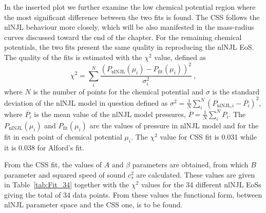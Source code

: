 \documentclass[%
 reprint,
superscriptaddress,
nofootinbib,
 amsmath,amssymb,
 aps,
]{revtex4-1}
\begin{document}
In the inserted plot we further examine the low chemical potential region where the most significant difference between the two fits is found. The CSS follows the nlNJL behaviour more closely, which will be also manifested in the mass-radius curves discussed toward the end of the chapter. For the remaining chemical potentials, the two fits present the same quality in reproducing the nlNJL EoS. The quality of the fits is estimated with the $\chi^2$ value, defined as 
\begin{equation}
    \chi^2 = \sum_i^N \frac{(P_{\textrm{nlNJL}}(\mu_i) - P_{\textrm{fit}}(\mu_i))^2}{\sigma_i^2} ~,
\end{equation}
where $N$ is the number of points for the chemical potential and $\sigma$ is the standard deviation of the nlNJL model in question defined as
$\sigma^2 = \frac{1}{N}\sum_i^N (P_{\textrm{nlNJL,} i} - \overline{P_i})^2$, where $\overline{P_i}$ is the mean value of the nlNJL model pressures, $\overline{P} = \frac{1}{N} \sum_i^N P_i$. The $P_{\textrm{nlNJL}}(\mu_i)$ and $P_{\textrm{fit}}(\mu_i)$ are the values of pressure in nlNJL model and for the fit in each point of chemical potential $\mu_i$. The $\chi^2$ value for CSS fit is 0.031 while it is 0.038 for Alford's fit.

From the CSS fit, the values of $A$ and $\beta$
parameters are obtained, from which $B$ parameter and squared speed of sound $c_s^2$ are calculated. These values are given in Table~\ref{tab:Fit_34} together with the $\chi^2$ values for the 34 different nlNJL EoSs giving the total of 34 data points. From these values the functional form, between nlNJL parameter space and the CSS one, is to be found. 
\end{document}
